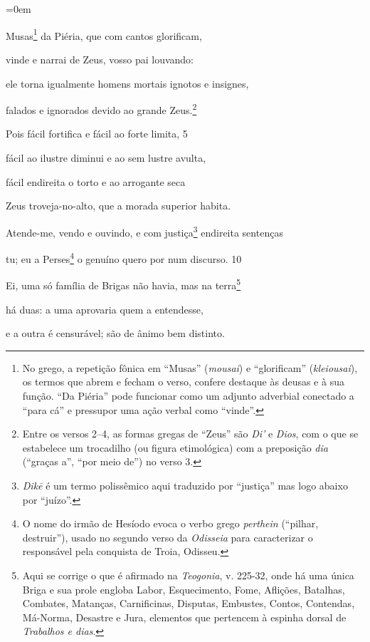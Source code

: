 \chapter*{}

\begingroup\parindent=0em

Musas\footnote{No grego, a repetição fônica em ``Musas'' (\emph{m\emph{ousai}}) e
``glorificam'' (\emph{klei\emph{ousai}}), os termos que abrem e fecham o
verso, confere destaque às deusas e à sua função. ``Da Piéria'' pode
funcionar como um adjunto adverbial conectado a ``para cá'' e pressupor
uma ação verbal como ``vinde''.} da Piéria, que com cantos glorificam,

vinde e narrai de Zeus, vosso pai louvando:

ele torna igualmente homens mortais ignotos e insignes,

falados e ignorados devido ao grande Zeus.\footnote{Entre os versos 2--4, as formas gregas de ``Zeus'' são \emph{Di'} e
\emph{Dios}, com o que se estabelece um trocadilho (ou figura
etimológica) com a preposição \emph{dia} (``graças a'', ``por meio de'')
no verso 3.}

Pois fácil fortifica e fácil ao forte limita, \num{5}

fácil ao ilustre diminui e ao sem lustre avulta,

fácil endireita o torto e ao arrogante seca

Zeus troveja-no-alto, que a morada superior habita.

Atende-me, vendo e ouvindo, e com justiça\footnote{\emph{Dikē} é um termo polissêmico aqui traduzido por ``justiça'' mas
logo abaixo por ``juízo''.} endireita \qb{}sentenças

tu; eu a Perses\footnote{O nome do irmão de Hesíodo evoca o verbo grego \emph{perthein}
(``pilhar, destruir''), usado no segundo verso da \emph{Odisseia} para
caracterizar o responsável pela conquista de Troia, Odisseu.} o genuíno quero por num discurso. \num{10}

Ei, uma só família de Brigas não havia, mas na terra\footnote{Aqui se corrige o que é afirmado na \emph{Teogonia}, v. 225-32, onde
há uma única Briga e sua prole engloba Labor, Esquecimento, Fome,
Aflições, Batalhas, Combates, Matanças, Carnificinas, Disputas,
Embustes, Contos, Contendas, Má-Norma, Desastre e Jura, elementos que
pertencem à espinha dorsal de \emph{Trabalhos e dias}.}

há duas: a uma aprovaria quem a entendesse,

e a outra é censurável; são de ânimo bem distinto.

